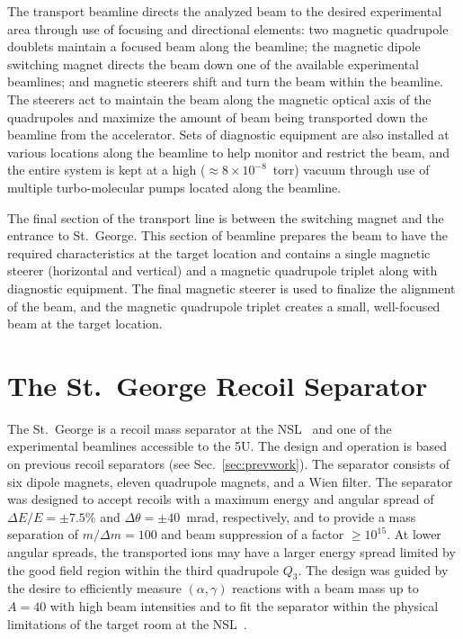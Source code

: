 The transport beamline directs the analyzed beam to the desired
experimental area through use of focusing and directional elements: two
magnetic quadrupole doublets maintain a focused beam along the beamline;
the magnetic dipole switching magnet directs the beam down one of the
available experimental beamlines; and magnetic steerers shift and turn
the beam within the beamline. The steerers act to maintain the beam
along the magnetic optical axis of the quadrupoles and maximize the
amount of beam being transported down the beamline from the accelerator.
Sets of diagnostic equipment are also installed at various locations
along the beamline to help monitor and restrict the beam, and the entire
system is kept at a high ($\approx 8\times 10^{-8}$~torr) vacuum through
use of multiple turbo-molecular pumps located along the beamline.

The final section of the transport line is between the switching magnet
and the entrance to St.\ George. This section of beamline prepares the
beam to have the required characteristics at the target location and
contains a single magnetic steerer (horizontal and vertical) and a
magnetic quadrupole triplet along with diagnostic equipment. The final
magnetic steerer is used to finalize the alignment of the beam, and the
magnetic quadrupole triplet creates a small, well-focused beam at the
target location.


\section{The St.\ George Recoil Separator}
\label{sec:stg}

The St.\ George is a recoil mass separator at the NSL~\cite{Couder2008}
and one of the experimental beamlines accessible to the 5U. The design
and operation is based on previous recoil separators (see
Sec.~\ref{sec:prevwork}). The separator consists of six dipole magnets,
eleven quadrupole magnets, and a Wien filter. The separator was designed
to accept recoils with a maximum energy and angular spread of $\Delta
E/E = \pm7.5\%$ and $\Delta\theta = \pm40$~mrad, respectively, and to
provide a mass separation of $m/\Delta m = 100$ and beam suppression of
a factor $\geq 10^{15}$. At lower angular spreads, the transported ions
may have a larger energy spread limited by the good field region within
the third quadrupole $Q_3$. The design was guided by the desire to
efficiently measure $(\alpha,\gamma)$ reactions with a beam mass up to
$A = 40$ with high beam intensities and to fit the separator within the
physical limitations of the target room at the NSL~\cite{Couder2008}.

